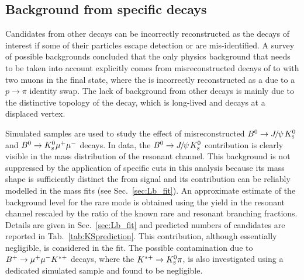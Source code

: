 \subsection{Background from specific decays}

Candidates from other decays can be incorrectly reconstructed as the decays of interest if
some of their particles escape detection or are mis-identified.
A survey of possible backgrounds concluded that the only physics background
that needs to be taken into account explicitly comes from misreconstructed decays of \Bz to \KS with
two muons in the final state, where the \KS is incorrectly reconstructed 
as a \Lz due to a $p\rightarrow \pi$ identity swap.
The lack of background from other decays is
mainly due to the distinctive topology of the \Lz decay, which is long-lived and decays at a displaced vertex.

Simulated samples are used to study the effect of misreconstructed $\Bz\ra\jpsi\KS$ and ${{B}^0}\rightarrow{\ensuremath{{K}^0_{\rm\scriptscriptstyle S}}}{\ensuremath{\mu^+\mu^-}}$ decays. 
In data, the $\Bz\ra\jpsi\KS$ contribution is clearly visible in the mass distribution of the resonant channel.
This background is not suppressed by the application of specific cuts in this analysis because its mass shape is sufficiently 
distinct the from \Lb signal and its contribution can be reliably modelled in the mass fits (see Sec.~\ref{sec:Lb_fit}).
An approximate estimate of the \KS background level for the rare mode is obtained using the yield in the resonant channel
rescaled by the ratio of the known rare and resonant branching fractions.
Details are given in Sec.~\ref{sec:Lb_fit} and predicted numbers of candidates are reported in Tab.~\ref{tab:KSprediction}.
This contribution, although essentially negligible, is considered in the fit.
The possible contamination due to $B^{+} \rightarrow{\ensuremath{\mu^+\mu^-}} K^{*+}$ decays, where the $K^{*+}\to\KS\pi$, is also 
investigated using a dedicated simulated sample and found to be negligible.

